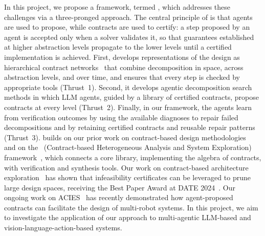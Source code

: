 In this project, we propose a framework, termed \sysname, which addresses these challenges via a three-pronged approach. The central principle of \sysname is that agents are used to propose, while contracts are used to certify: a step proposed by an agent is accepted only when a solver validates it, so that guarantees established at higher abstraction levels propagate to the lower levels until a certified implementation is achieved. First, \sysname develops representations of the design as hierarchical contract networks~\cite{naik2024contract,wang2022hierarchical} that combine decomposition in space, across abstraction levels, and over time, and ensures that every step is checked by appropriate tools (Thrust~1). Second, it develops agentic decomposition search methods in which LLM agents, guided by a library of certified contracts, propose contracts at every level (Thrust~2). Finally, in our framework, the agents learn from verification outcomes by using the available diagnoses to repair failed decompositions and by retaining certified contracts and reusable repair patterns (Thrust~3). \sysname builds on our prior work on contract-based design methodologies~\cite{nuzzo2015platform} and on the \chase~{(Contract-based Heterogeneous Analysis and System Exploration)} framework~\cite{nuzzo2018chase}, which connects a core library, implementing the algebra of contracts, with verification and synthesis tools. 
Our work on contract-based architecture exploration~\cite{xiao2024contrarc,xiao2026smcp} has shown that infeasibility certificates can be leveraged to prune large design spaces, receiving 
the Best Paper Award at DATE 2024~\cite{xiao2024contrarc}. 
Our ongoing work on ACIES~\cite{xiao2026acies} has recently demonstrated how agent-proposed contracts can facilitate the design of multi-robot systems. 
In this project, we aim to investigate the application of our approach to multi-agentic LLM-based and vision-language-action-based systems. 

